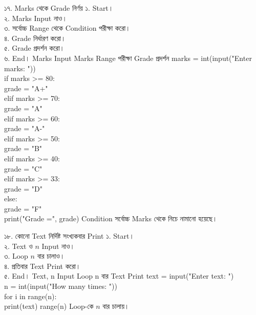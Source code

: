 
\exerciseTable
{১৭. Marks থেকে Grade নির্ণয়}
{
১. Start।\\
২. Marks Input নাও।\\
৩. সর্বোচ্চ Range থেকে Condition পরীক্ষা করো।\\
৪. Grade নির্ধারণ করো।\\
৫. Grade প্রদর্শন করো।\\
৬. End।
}
{
\linearflow
{Marks Input}
{Marks Range পরীক্ষা}
{Grade প্রদর্শন}
}
{
marks = int(input("Enter marks: "))\\[0.5mm]
if marks >= 80:\\
\hspace*{4mm}grade = "A+"\\
elif marks >= 70:\\
\hspace*{4mm}grade = "A"\\
elif marks >= 60:\\
\hspace*{4mm}grade = "A-"\\
elif marks >= 50:\\
\hspace*{4mm}grade = "B"\\
elif marks >= 40:\\
\hspace*{4mm}grade = "C"\\
elif marks >= 33:\\
\hspace*{4mm}grade = "D"\\
else:\\
\hspace*{4mm}grade = "F"\\
print("Grade =", grade)
}
{
Condition সর্বোচ্চ Marks থেকে নিচে নামানো হয়েছে।
}




\exerciseTable
{১৮. কোনো Text নির্দিষ্ট সংখ্যকবার Print}
{
১. Start।\\
২. Text ও \(n\) Input নাও।\\
৩. Loop \(n\) বার চালাও।\\
৪. প্রতিবার Text Print করো।\\
৫. End।
}
{
\linearflow
{Text, n Input}
{Loop n বার}
{Text Print}
}
{
text = input("Enter text: ")\\
n = int(input("How many times: "))\\
for i in range(n):\\
\hspace*{4mm}print(text)
}
{
\textenglish{\ttfamily range(n)}
Loop-কে \(n\) বার চালায়।
}

